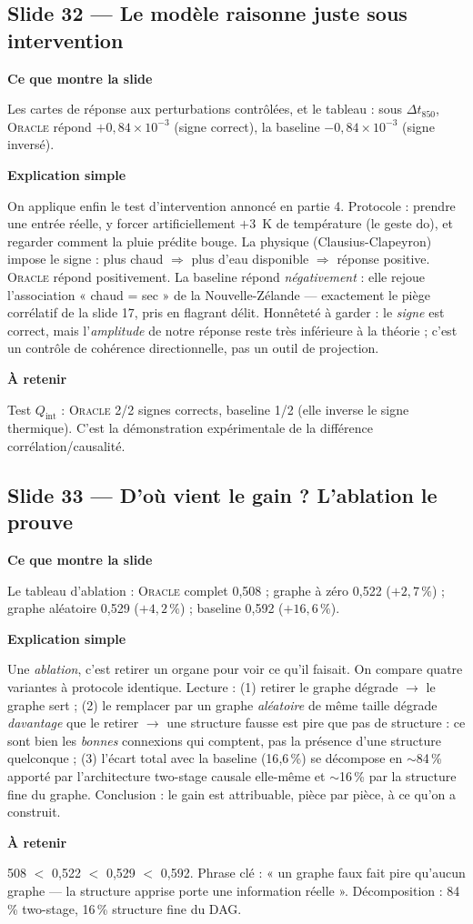 \documentclass[11pt,a4paper]{article}
\newcommand{\slide}[2]{\subsection*{\textcolor{bleu}{Slide #1 --- #2}}}
\newcommand{\bloc}[1]{\par\medskip\noindent\textcolor{accent}{\textbf{#1}}\par\nopagebreak\smallskip}
\begin{document}
\slide{32}{Le modèle raisonne juste sous intervention}

\bloc{Ce que montre la slide}
Les cartes de réponse aux perturbations contrôlées, et le tableau : sous $\Delta t_{850}$, \textsc{Oracle} répond $+0{,}84\times10^{-3}$ (signe correct), la baseline $-0{,}84\times10^{-3}$ (signe inversé).

\bloc{Explication simple}
On applique enfin le test d'intervention annoncé en partie 4. Protocole : prendre une entrée réelle, y forcer artificiellement $+3$~K de température (le geste $\mathrm{do}$), et regarder comment la pluie prédite bouge. La physique (Clausius-Clapeyron) impose le signe : plus chaud $\Rightarrow$ plus d'eau disponible $\Rightarrow$ réponse positive. \textsc{Oracle} répond positivement. La baseline répond \emph{négativement} : elle rejoue l'association « chaud = sec » de la Nouvelle-Zélande --- exactement le piège corrélatif de la slide 17, pris en flagrant délit. Honnêteté à garder : le \emph{signe} est correct, mais l'\emph{amplitude} de notre réponse reste très inférieure à la théorie ; c'est un contrôle de cohérence directionnelle, pas un outil de projection.

\bloc{À retenir}
Test $Q_{\mathrm{int}}$ : \textsc{Oracle} 2/2 signes corrects, baseline 1/2 (elle inverse le signe thermique). C'est la démonstration expérimentale de la différence corrélation/causalité.

\slide{33}{D'où vient le gain ? L'ablation le prouve}

\bloc{Ce que montre la slide}
Le tableau d'ablation : \textsc{Oracle} complet 0{,}508 ; graphe à zéro 0{,}522 ($+2{,}7\,\%$) ; graphe aléatoire 0{,}529 ($+4{,}2\,\%$) ; baseline 0{,}592 ($+16{,}6\,\%$).

\bloc{Explication simple}
Une \emph{ablation}, c'est retirer un organe pour voir ce qu'il faisait. On compare quatre variantes à protocole identique. Lecture : (1) retirer le graphe dégrade $\to$ le graphe sert ; (2) le remplacer par un graphe \emph{aléatoire} de même taille dégrade \emph{davantage} que le retirer $\to$ une structure fausse est pire que pas de structure : ce sont bien les \emph{bonnes} connexions qui comptent, pas la présence d'une structure quelconque ; (3) l'écart total avec la baseline (16{,}6\,\%) se décompose en $\sim$84\,\% apporté par l'architecture two-stage causale elle-même et $\sim$16\,\% par la structure fine du graphe. Conclusion : le gain est attribuable, pièce par pièce, à ce qu'on a construit.

\bloc{À retenir}
0{,}508 $<$ 0{,}522 $<$ 0{,}529 $<$ 0{,}592. Phrase clé : « un graphe faux fait pire qu'aucun graphe --- la structure apprise porte une information réelle ». Décomposition : 84\,\% two-stage, 16\,\% structure fine du DAG.
\end{document}
